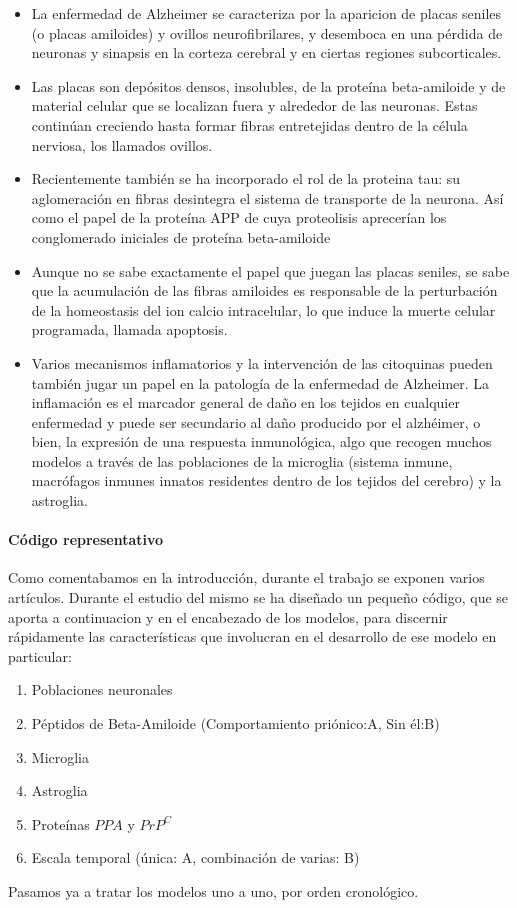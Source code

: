 \documentclass[1p]{elsarticle}
\begin{document}
\begin{itemize}
	\item La enfermedad de Alzheimer se caracteriza por la aparicion de placas seniles (o placas amiloides) y ovillos neurofibrilares, y desemboca en una pérdida de neuronas y sinapsis en la corteza cerebral y en ciertas regiones subcorticales.
	\item Las placas son depósitos densos, insolubles, de la proteína beta-amiloide y de material celular que se localizan fuera y alrededor de las neuronas. Estas continúan creciendo hasta formar fibras entretejidas dentro de la célula nerviosa, los llamados ovillos.
	\item Recientemente también se ha incorporado el rol de la proteina tau: su aglomeración en fibras desintegra el sistema de transporte de la neurona. Así como el papel de la proteína APP de cuya proteolisis aprecerían los 
	conglomerado iniciales de proteína beta-amiloide
	\item Aunque no se sabe exactamente el papel que juegan las placas seniles, se sabe que la acumulación de las fibras amiloides es responsable de la perturbación de la homeostasis del ion calcio intracelular, lo que induce la muerte celular programada, llamada apoptosis.
	\item Varios mecanismos inflamatorios y la intervención de las citoquinas pueden también jugar un papel en la patología de la enfermedad de Alzheimer. La inflamación es el marcador general de daño en los tejidos en cualquier enfermedad y puede ser secundario al daño producido por el alzhéimer, o bien, la expresión de una respuesta inmunológica, algo que recogen muchos modelos a través de las poblaciones de la microglia (sistema inmune, macrófagos inmunes innatos residentes dentro de los tejidos del cerebro) y la astroglia.
\end{itemize}
\paragraph{Código representativo}

Como comentabamos en la introducción, durante el trabajo se exponen varios artículos. Durante el estudio del mismo se ha diseñado un pequeño código, que se aporta a continuacion y en el encabezado de los modelos, para discernir rápidamente las características que involucran en el desarrollo de ese modelo en particular:
 \begin{enumerate}
 	\item Poblaciones neuronales
 	\item Péptidos de Beta-Amiloide (Comportamiento priónico:A, Sin él:B)
 	\item Microglia
 	\item Astroglia
 	\item Proteínas $PPA$ y $PrP^C$
 	\item Escala temporal (única: A, combinación de varias: B)
 \end{enumerate}
Pasamos ya a tratar los modelos uno a uno, por orden cronológico. 
\end{document}
